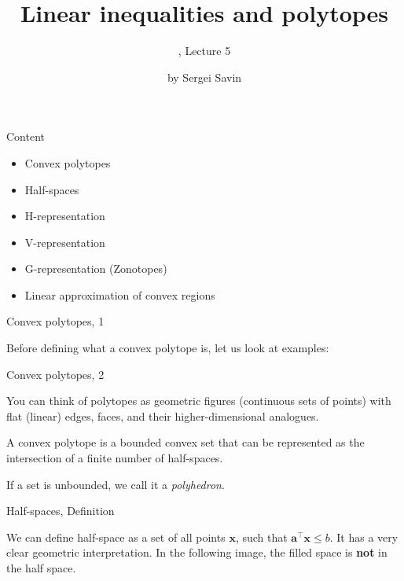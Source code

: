 \documentclass{beamer}
\title{Linear inequalities and polytopes}
\subtitle{\mycoursetitle, Lecture 5}
\author{by Sergei Savin}
\date{\mydate}
\begin{document}
\maketitle


\begin{frame}{Content}

\begin{itemize}
\item Convex polytopes
\item Half-spaces
\item H-representation
\item V-representation
\item G-representation (Zonotopes)
\item Linear approximation of convex regions
\end{itemize}

\end{frame}



\begin{frame}{Convex polytopes, 1}
\begin{flushleft}

Before defining what a convex polytope is, let us look at examples:


 
\end{flushleft}
\end{frame}


\begin{frame}{Convex polytopes, 2}
\begin{flushleft}

You can think of polytopes as geometric figures (continuous sets of points) with flat (linear) edges, faces, and their higher-dimensional analogues.

\bigskip

\begin{definition}
	A convex polytope is a bounded convex set that can be represented as the intersection of a finite number of half-spaces.
\end{definition}

\bigskip
 
 If a set is unbounded, we call it a \emph{polyhedron}.
 
\end{flushleft}
\end{frame}


\begin{frame}{Half-spaces, Definition}
\begin{flushleft}

We can define half-space as a set of all points $\mathbf{x}$, such that $\mathbf{a}^\top \mathbf{x} \leq b$. It has a very clear geometric interpretation. In the following image, the filled space is \textbf{not} in the half space.


 
\end{flushleft}
\end{frame}
\end{document}
